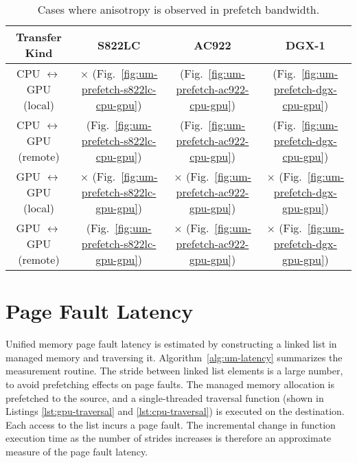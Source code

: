 \begin{table}[ht]
	\centering
	\caption[Anisotropy in Prefetch Bandwidth]{
		Cases where anisotropy is observed in prefetch bandwidth.
	}
	\label{tab:um-prefetch-anisotropy}
	\begin{tabular}{cccc}
		\hline
		\textbf{Transfer Kind}             & \textbf{S822LC}                                        & \textbf{AC922}                                        & \textbf{DGX-1}                                      \\ \hline 
		CPU $\leftrightarrow$ GPU (local)  & $\times$   (Fig.~\ref{fig:um-prefetch-s822lc-cpu-gpu}) & \checkmark (Fig.~\ref{fig:um-prefetch-ac922-cpu-gpu}) & \checkmark (Fig.~\ref{fig:um-prefetch-dgx-cpu-gpu}) \\ \hline
		CPU $\leftrightarrow$ GPU (remote) & \checkmark (Fig.~\ref{fig:um-prefetch-s822lc-cpu-gpu}) & \checkmark (Fig.~\ref{fig:um-prefetch-ac922-cpu-gpu}) & \checkmark (Fig.~\ref{fig:um-prefetch-dgx-cpu-gpu}) \\ \hline
		GPU $\leftrightarrow$ GPU (local)  & $\times$   (Fig.~\ref{fig:um-prefetch-s822lc-gpu-gpu}) & $\times$   (Fig.~\ref{fig:um-prefetch-ac922-gpu-gpu}) & $\times$ (Fig.~\ref{fig:um-prefetch-dgx-gpu-gpu})   \\ \hline
		GPU $\leftrightarrow$ GPU (remote) & \checkmark (Fig.~\ref{fig:um-prefetch-s822lc-gpu-gpu}) & $\times$   (Fig.~\ref{fig:um-prefetch-ac922-gpu-gpu}) & $\times$ (Fig.~\ref{fig:um-prefetch-dgx-gpu-gpu})   \\ \hline
	\end{tabular}
\end{table}

%
%
%
\section{Page Fault Latency}
\label{sec:um-page-fault}

Unified memory page fault latency is estimated by constructing a linked list in managed memory and traversing it.
Algorithm~\ref{alg:um-latency} summarizes the measurement routine.
The stride between linked list elements is a large number, to avoid prefetching effects on page faults.
The managed memory allocation is prefetched to the source, and a single-threaded traversal function (shown in Listings \ref{lst:gpu-traversal} and \ref{lst:cpu-traversal}) is executed on the destination.
Each access to the list incurs a page fault.
The incremental change in function execution time as the number of strides increases is therefore an approximate measure of the page fault latency.



